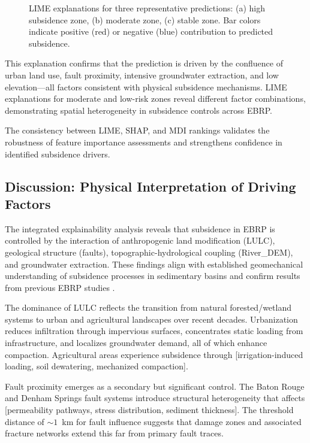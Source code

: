 \begin{figure}[!t]
\centering
\caption{LIME explanations for three representative predictions: (a) high subsidence zone, (b) moderate zone, (c) stable zone. Bar colors indicate positive (red) or negative (blue) contribution to predicted subsidence.}
\label{fig:lime_examples}
\end{figure}

This explanation confirms that the prediction is driven by the confluence of urban land use, fault proximity, intensive groundwater extraction, and low elevation—all factors consistent with physical subsidence mechanisms. LIME explanations for moderate and low-risk zones reveal different factor combinations, demonstrating spatial heterogeneity in subsidence controls across EBRP.

The consistency between LIME, SHAP, and MDI rankings validates the robustness of feature importance assessments and strengthens confidence in identified subsidence drivers.

\subsection{Discussion: Physical Interpretation of Driving Factors}

The integrated explainability analysis reveals that subsidence in EBRP is controlled by the interaction of anthropogenic land modification (LULC), geological structure (faults), topographic-hydrological coupling (River\_DEM), and groundwater extraction. These findings align with established geomechanical understanding of subsidence processes in sedimentary basins \citep{Higgins2016} and confirm results from previous EBRP studies \citep{Abdalla2024}.

The dominance of LULC reflects the transition from natural forested/wetland systems to urban and agricultural landscapes over recent decades. Urbanization reduces infiltration through impervious surfaces, concentrates static loading from infrastructure, and localizes groundwater demand, all of which enhance compaction. Agricultural areas experience subsidence through [irrigation-induced loading, soil dewatering, mechanized compaction].

Fault proximity emerges as a secondary but significant control. The Baton Rouge and Denham Springs fault systems introduce structural heterogeneity that affects [permeability pathways, stress distribution, sediment thickness]. The threshold distance of $\sim 1$~km for fault influence suggests that damage zones and associated fracture networks extend this far from primary fault traces.

